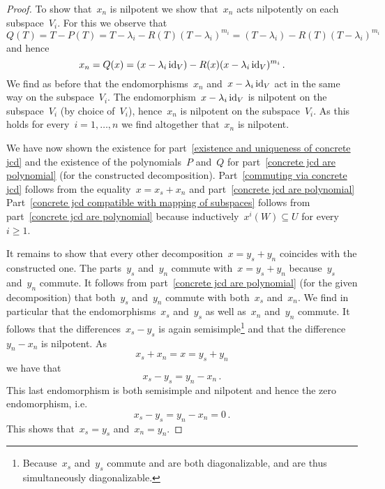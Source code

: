 \begin{proof}
  To show that~$x_n$ is nilpotent we show that~$x_n$ acts nilpotently on each subspace~$V_i$.
  For this we observe that
  \[
    Q(T)
    =
    T - P(T)
    =
    T - \lambda_i - R(T) (T - \lambda_i)^{m_i}
    =
    (T - \lambda_i) - R(T) (T - \lambda_i)^{m_i}
  \]
  and hence
  \[
    x_n
    =
    Q(x)
    =
    (x - \lambda_i \operatorname{id}_V) - R(x) (x - \lambda_i \operatorname{id}_V)^{m_i}  \,.
  \]
  We find as before that the endomorphisms~$x_n$ and~$x - \lambda_i \operatorname{id}_V$ act in the same way on the subspace~$V_i$.
  The endomorphism~$x - \lambda_i \operatorname{id}_V$ is nilpotent on the subspace~$V_i$ (by choice of~$V_i$), hence~$x_n$ is nilpotent on the subspace~$V_i$.
  As this holds for every~$i = 1, \dotsc, n$ we find altogether that~$x_n$ is nilpotent.
  
  We have now shown the existence for part~\ref*{existence and uniqueness of concrete jcd} and the existence of the polynomials~$P$ and~$Q$ for part~\ref*{concrete jcd are polynomial} (for the constructed decomposition).
  Part~\ref*{commuting via concrete jcd} follows from the equality~$x = x_s + x_n$ and part~\ref*{concrete jcd are polynomial}
  Part~\ref*{concrete jcd compatible with mapping of subspaces} follows from part~\ref*{concrete jcd are polynomial} because inductively~$x^i(W) \subseteq U$ for every~$i \geq 1$.
  
  It remains to show that every other decomposition~$x = y_s + y_n$ coincides with the constructed one.
  The parts~$y_s$ and~$y_n$ commute with~$x = y_s + y_n$ because~$y_s$ and~$y_n$ commute.
  It follows from part~\ref*{concrete jcd are polynomial} (for the given decomposition) that both~$y_s$ and~$y_n$ commute with both~$x_s$ and~$x_n$.
  We find in particular that the endomorphisms~$x_s$ and~$y_s$ as well as~$x_n$ and~$y_n$ commute.
  It follows that the differences~$x_s - y_s$ is again semisimple\footnote{Because~$x_s$ and~$y_s$ commute and are both diagonalizable, and are thus simultaneously diagonalizable.} and that the difference~$y_n - x_n$ is nilpotent.
  As
  \[
    x_s + x_n
    =
    x
    =
    y_s + y_n
  \]
  we have that
  \[
    x_s - y_s
    =
    y_n - x_n \,.
  \]
  This last endomorphism is both semisimple and nilpotent and hence the zero endomorphism, i.e.
  \[
    x_s - y_s
    =
    y_n - x_n
    =
    0 \,.
  \]
  This shows that~$x_s = y_s$ and~$x_n = y_n$.
\end{proof}


